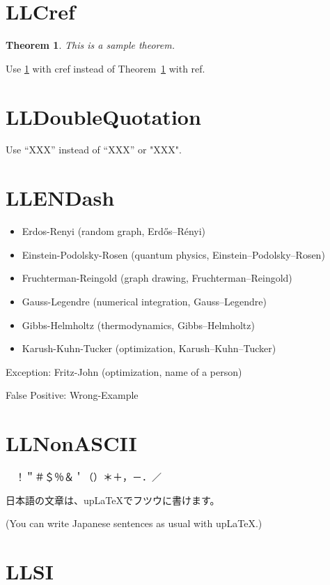\documentclass[a4paper, 10pt]{article}
\newtheorem{theorem}{Theorem}
\begin{document}
\section{LLCref}

\begin{theorem}
    \label{thm:sample}
    This is a sample theorem.
\end{theorem}

Use \cref{thm:sample} with cref instead of Theorem~\ref{thm:sample} with ref.

\section{LLDoubleQuotation}

Use ``XXX'' instead of “XXX” or "XXX".

\section{LLENDash}

\begin{itemize}
    \item Erdos-Renyi (random graph, Erd\H{o}s--R\'enyi)
    \item Einstein-Podolsky-Rosen (quantum physics, Einstein--Podolsky--Rosen)
    \item Fruchterman-Reingold (graph drawing, Fruchterman--Reingold)
    \item Gauss-Legendre (numerical integration, Gauss--Legendre)
    \item Gibbs-Helmholtz (thermodynamics, Gibbs--Helmholtz)
    \item Karush-Kuhn-Tucker (optimization, Karush--Kuhn--Tucker)
\end{itemize}

Exception: Fritz-John (optimization, name of a person)

False Positive: Wrong-Example

\section{LLNonASCII}

 {　}！＂＃＄％＆＇（）＊＋，－．／

日本語の文章は、upLaTeXでフツウに書けます。

(You can write Japanese sentences as usual with upLaTeX.)

\section{LLSI}
\end{document}
